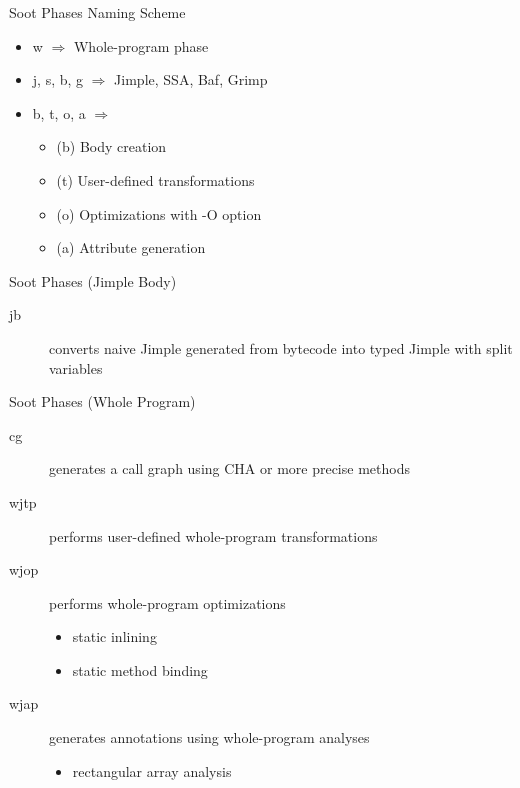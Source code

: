 \begin{slide}{Soot Phases Naming Scheme}
\begin{itemize}
\item w $\Rightarrow$ Whole-program phase
\item j, s, b, g $\Rightarrow$ Jimple, SSA, Baf, Grimp
\item b, t, o, a $\Rightarrow$
\begin{itemize}
\item (b) Body creation
\item (t) User-defined transformations
\item (o) Optimizations with -O option
\item (a) Attribute generation
\end{itemize}
\end{itemize}
\end{slide}

\begin{slide}{Soot Phases (Jimple Body)}
\begin{description}
\item[jb] converts naive Jimple generated from bytecode into
typed Jimple with split variables
\end{description}
\end{slide}

\begin{slide}{Soot Phases (Whole Program)}
\begin{description}
\item[cg] generates a call graph using CHA or more precise methods
\item[wjtp] performs user-defined whole-program transformations
\item[wjop] performs whole-program optimizations
\begin{itemize}
\item static inlining
\item static method binding
\end{itemize}
\item[wjap] generates annotations using whole-program analyses
\begin{itemize}
\item rectangular array analysis
\end{itemize}
\end{description}
\end{slide}

